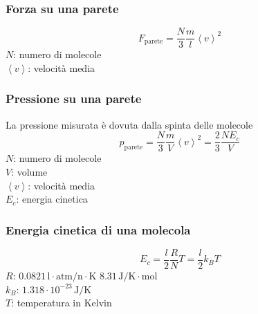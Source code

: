 \begin{center}
\end{center}

\subsubsection{Forza su una parete}
\begin{equation*}
  F_{\text{parete}} = \frac{N}{3}\frac{m}{l}\left\langle v\right\rangle^2
\end{equation*}
$N$: numero di molecole\\
$\left\langle v\right\rangle$: velocità media

\subsubsection{Pressione su una parete}
La pressione misurata è dovuta dalla spinta delle molecole
\begin{equation*}
  p_{\text{parete}}=\frac{N}{3}\frac{m}{V}\left\langle v\right\rangle^2 = \frac{2}{3}\frac{NE_c}{V}
\end{equation*}
$N$: numero di molecole\\
$V$: volume\\
$\left\langle v\right\rangle$: velocità media\\
$E_c$: energia cinetica\\

\subsubsection{Energia cinetica di una molecola}
\begin{equation*}
  E_c = \frac{l}{2}\frac{R}{N}T = \frac{l}{2}k_BT
\end{equation*}
\hyperref[tab:R]{$R$}: $0.0821\,\text{l}\cdot\text{atm/n}\cdot\text{K}$
$8.31\,\text{J/K}\cdot\text{mol}$\\
\hyperref[tab:kB]{$k_B$}: $1.318\cdot10^{-23}\,\text{J/K}$\\
$T$: temperatura in Kelvin\\[\baselineskip]

